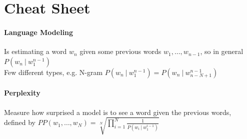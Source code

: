 \documentclass[10pt]{report}
\begin{document}
\section{Cheat Sheet}
\paragraph{Language Modeling} Is estimating a word $w_n$ given some previous words $w_1,\ldots,w_{n-1}$, so in general $P(w_n\:|\:w_1^{n-1})$\\
Few different types, e.g. N-gram $P(w_n\:|\:w_1^{n-1}) = P(w_n\:|\:w_{n-N+1}^{n-1})$
\paragraph{Perplexity} Measure how surprised a model is to see a word given the previous words,\\defined by $PP(w_1,\ldots,w_N)=\sqrt[N]{\prod_{i=1}^N\frac{1}{P(w_i\:|\:w_1^{i-1})}}$
\end{document}
